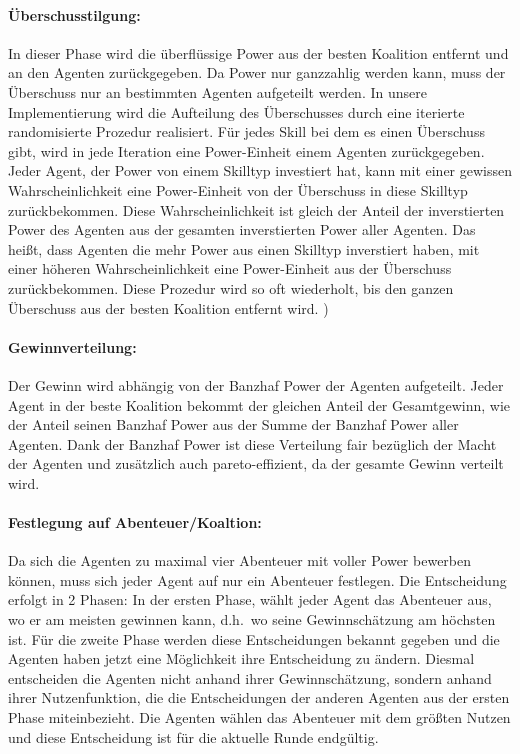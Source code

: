 \documentclass[fleqn,10pt]{article} %
\begin{document}
\paragraph{Überschusstilgung:} 
In dieser Phase wird die überflüssige Power aus der besten Koalition entfernt und an den Agenten zurückgegeben. Da Power nur ganzzahlig werden kann, muss der Überschuss nur an bestimmten Agenten aufgeteilt werden. In unsere Implementierung wird die Aufteilung des Überschusses durch eine iterierte randomisierte Prozedur realisiert. Für jedes Skill bei dem es einen Überschuss gibt, wird in jede Iteration eine Power-Einheit einem Agenten zurückgegeben. Jeder Agent, der Power von einem Skilltyp investiert hat, kann mit einer gewissen Wahrscheinlichkeit eine Power-Einheit von der Überschuss in diese Skilltyp zurückbekommen. Diese Wahrscheinlichkeit ist gleich der Anteil der inverstierten Power des Agenten aus der gesamten inverstierten Power aller Agenten. Das heißt, dass Agenten die mehr Power aus einen Skilltyp inverstiert haben, mit einer höheren Wahrscheinlichkeit eine Power-Einheit aus der Überschuss zurückbekommen. Diese Prozedur wird so oft wiederholt, bis den ganzen Überschuss aus der besten Koalition entfernt wird.
)
\paragraph{Gewinnverteilung:}
Der Gewinn wird abhängig von der Banzhaf Power der Agenten aufgeteilt. Jeder Agent in der beste Koalition bekommt der gleichen Anteil der Gesamtgewinn, wie der Anteil seinen Banzhaf Power aus der Summe der Banzhaf Power aller Agenten. Dank der Banzhaf Power ist diese Verteilung fair bezüglich der Macht der Agenten und zusätzlich auch pareto-effizient, da der gesamte Gewinn verteilt wird.

\paragraph{Festlegung auf Abenteuer/Koaltion:}
Da sich die Agenten zu maximal vier Abenteuer mit voller Power bewerben können, muss sich jeder Agent auf nur ein Abenteuer festlegen. Die Entscheidung erfolgt in 2 Phasen: In der ersten Phase, wählt jeder Agent das Abenteuer aus, wo er am meisten gewinnen kann, d.h.\ wo seine Gewinnschätzung am höchsten ist. Für die zweite Phase werden diese Entscheidungen bekannt gegeben und die Agenten haben jetzt eine Möglichkeit ihre Entscheidung zu ändern. Diesmal entscheiden die Agenten nicht anhand ihrer Gewinnschätzung, sondern anhand ihrer Nutzenfunktion, die die Entscheidungen der anderen Agenten aus der ersten Phase miteinbezieht. Die Agenten wählen das Abenteuer mit dem größten Nutzen und diese Entscheidung ist für die aktuelle Runde endgültig.
\end{document}
